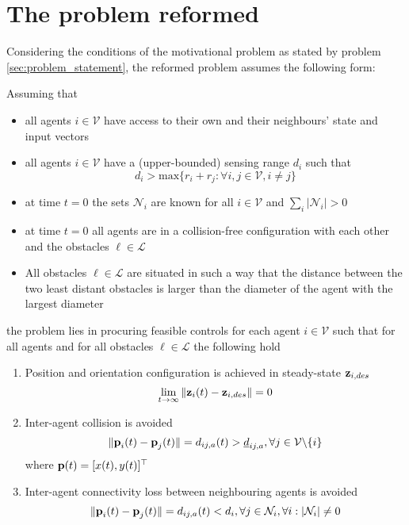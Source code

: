 \section{The problem reformed}

Considering the conditions of the motivational problem as stated by problem
\eqref{sec:problem_statement}, the reformed problem assumes the following form:

\begin{problem}
Assuming that
\begin{itemize}
  \item all agents $i \in \mathcal{V}$ have access to their own and their
    neighbours' state and input vectors

  \item all agents $i \in \mathcal{V}$ have a (upper-bounded) sensing range
   $d_i$ such that
   $$d_i > \text{max}\{r_i + r_j: \forall i,j \in \mathcal{V}, i \neq j\}$$

  \item at time $t=0$ the sets $\mathcal{N}_i$ are known for all
    $i \in \mathcal{V}$ and $\sum\limits_i |\mathcal{N}_i| > 0$

  \item at time $t=0$ all agents are in a collision-free configuration with
    each other and the obstacles $\ell \in \mathcal{L}$

  \item All obstacles $\ell \in \mathcal{L}$ are situated
    in such a way that the distance between the two least distant obstacles
    is larger than the diameter of the agent with the largest diameter

\end{itemize}

the problem lies in procuring feasible controls for each agent $i \in \mathcal{V}$
such that for all agents and for all obstacles $\ell \in \mathcal{L}$ the
following hold
\begin{enumerate}
  \item Position and orientation configuration is achieved in steady-state
    $\bm{\mathbf{z}}_{i,des}$
    $$\lim_{t \to \infty} \|\bm{\mathbf{z}}_i(t) - \bm{\mathbf{z}}_{i,des}\| = 0$$

  \item Inter-agent collision is avoided
    $$\|\bm{\mathbf{p}}_i(t) - \bm{\mathbf{p}}_j(t)\| = d_{ij,a}(t) > \underline{d}_{ij,a},
    \forall j \in \mathcal{V} \backslash \{i\}$$
    where $\bm{\mathbf{p}}(t) = [x(t), y(t)]^{\top}$

  \item Inter-agent connectivity loss between neighbouring agents is avoided
    $$ \|\bm{\mathbf{p}}_i(t) - \bm{\mathbf{p}}_j(t)\| = d_{ij,a} (t) < d_i,
    \forall j \in \mathcal{N}_i, \forall i : |\mathcal{N}_i| \not= 0$$


\end{enumerate}
\end{problem}
